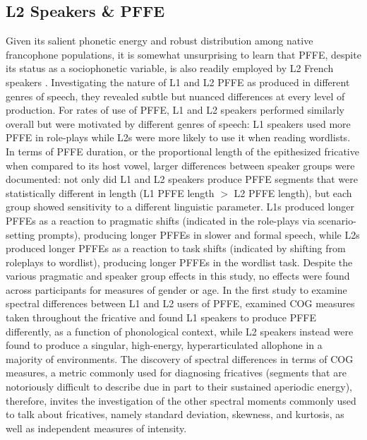 \documentclass[output=paper,colorlinks,citecolor=brown,draftmode]{langscibook}
\begin{document}
\subsection{L2 Speakers \& PFFE}
Given its salient phonetic energy and robust distribution among native francophone populations, it is somewhat unsurprising to learn that PFFE, despite its status as a sociophonetic variable, is also readily employed by L2 French speakers \citep{dalola2017sociophonetic}. Investigating the nature of L1 and L2 PFFE as produced in different genres of speech, they revealed subtle but nuanced differences at every level of production. For rates of use of PFFE, L1 and L2 speakers performed similarly overall but were motivated by different genres of speech: L1 speakers used more PFFE in role-plays while L2s were more likely to use it when reading wordlists. In terms of PFFE duration, or the proportional length of the epithesized fricative when compared to its host vowel, larger differences between speaker groups were documented: not only did L1 and L2 speakers produce PFFE segments that were statistically different in length (L1 PFFE length $>$ L2 PFFE length), but each group showed sensitivity to a different linguistic parameter. L1s produced longer PFFEs as a reaction to pragmatic shifts (indicated in the role-plays via scenario-setting prompts), producing longer PFFEs in slower and formal speech, while L2s produced longer PFFEs as a reaction to task shifts (indicated by shifting from roleplays to wordlist), producing longer PFFEs in the wordlist task. Despite the various pragmatic and speaker group effects in this study, no effects were found across participants for measures of gender or age. In the first study to examine spectral differences between L1 and L2 users of PFFE, \citet{dalola2020redefining} examined COG measures taken throughout the fricative and found L1 speakers to produce PFFE differently, as a function of phonological context, while L2 speakers instead were found to produce a singular, high-energy, hyperarticulated allophone in a majority of environments. The discovery of spectral differences in terms of COG measures, a metric commonly used for diagnosing fricatives (segments that are notoriously difficult to describe due in part to their sustained aperiodic energy), therefore, invites the investigation of the other spectral moments commonly used to talk about fricatives, namely standard deviation, skewness, and kurtosis, as well as independent measures of intensity.
\end{document}
